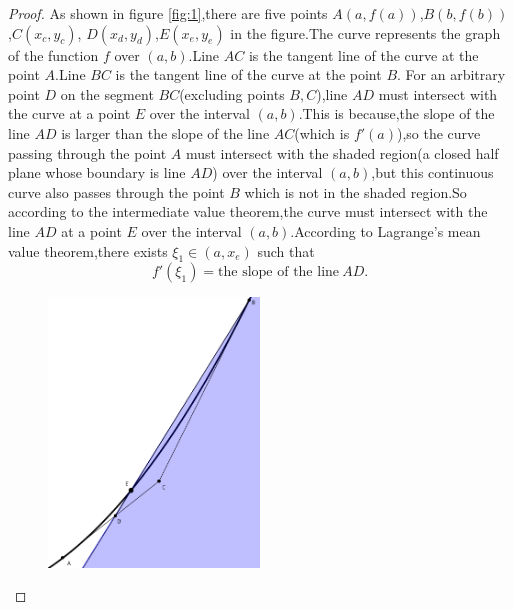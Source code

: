 \documentclass{amsart}
\theoremstyle{plain}
\theoremstyle{definition}
\begin{document}
\begin{proof}
  As shown in figure \eqref{fig:1},there are five points
  $A(a,f(a))$,$B(b,f(b))$,$C(x_c,y_c)$, $D(x_{d},y_{d})$,$E(x_e,y_e)$ in the figure.The curve represents the graph
  of the function $f$ over $(a,b)$.Line $AC$ is the tangent line of the curve at
  the point $A$.Line $BC$ is the tangent line of the curve at the
  point $B$. For an arbitrary point $D$ on the segment $BC$(excluding points
  $B,C$),line $AD$ must
  intersect with the curve at a point $E$ over the interval
  $(a,b)$.This is because,the slope of the line $AD$ is larger than
  the slope of the line $AC$(which is $f'(a)$),so the curve passing through the point
  $A$ must intersect with the shaded region(a closed half plane whose
  boundary is line $AD$) over the interval $(a,b)$,but this continuous curve also
  passes through the point $B$ which is not in the shaded region.So according to the intermediate value theorem,the curve must
  intersect with the line $AD$ at a point $E$ over the interval
  $(a,b)$.According to Lagrange's mean value theorem,there exists
  $\xi_1\in (a,x_e)$ such that 
\begin{equation}\label{eq:1}
f'(\xi_1)=\mbox{the slope of the line} ~AD.
\end{equation}

\begin{figure}[h]\centering
\includegraphics[width=0.5\textwidth]{A_geometric_proof_of_Darboux_theorem2.png}
  \caption{}
  \label{fig:2}
\end{figure}


\end{proof}
\end{document}
